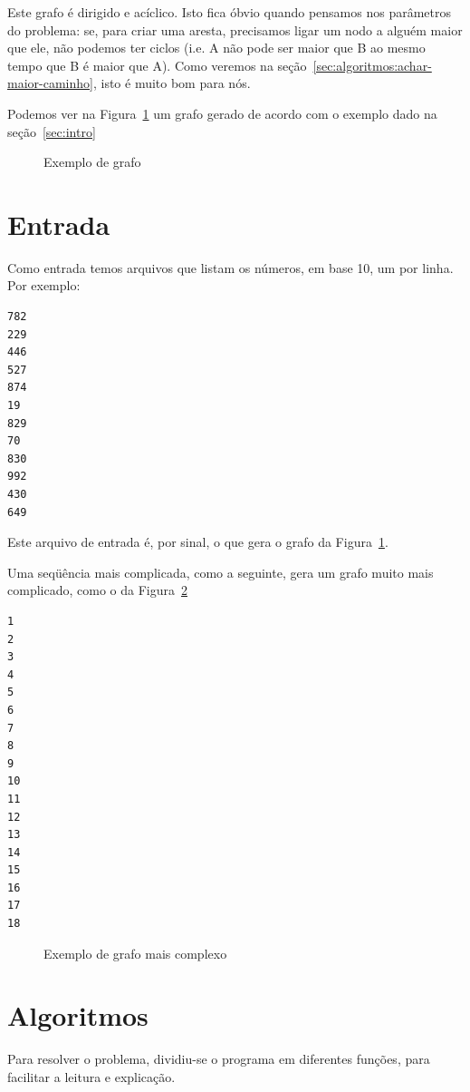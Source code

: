 \documentclass[12pt]{article}
\begin{document}
Este grafo é dirigido e acíclico. Isto fica óbvio quando pensamos nos parâmetros do problema: se, para criar uma aresta, precisamos ligar um nodo a alguém maior que ele, não podemos ter ciclos (i.e. A não pode ser maior que B ao mesmo tempo que B é maior que A). Como veremos na se\c{c}ão~\ref{sec:algoritmos:achar-maior-caminho}, isto é muito bom para nós.


Podemos ver na Figura~\ref{fig:testeprof} um grafo gerado de acordo com o exemplo dado na se\c{c}ão~\ref{sec:intro}

\begin{figure}[h!]
    \begin{dot2tex}[neato,options=-tmath]
        
    \end{dot2tex}
    \caption{Exemplo de grafo}
    \label{fig:testeprof}
\end{figure}

\section{Entrada}\label{sec:entrada}
Como entrada temos arquivos que listam os números, em base 10, um por linha. Por exemplo:
\begin{lstlisting}
782
229
446
527
874
19
829
70
830
992
430
649
\end{lstlisting}

Este arquivo de entrada é, por sinal, o que gera o grafo da Figura~\ref{fig:testeprof}.

Uma seqüência mais complicada, como a seguinte, gera um grafo muito mais complicado, como o da Figura~\ref{fig:testebobo}
\begin{lstlisting}
1
2
3
4
5
6
7
8
9
10
11
12
13
14
15
16
17
18
\end{lstlisting}

\begin{figure}[h!]
  \begin{dot2tex}[neato,options=-tmath]
    
  \end{dot2tex}
  \caption{Exemplo de grafo mais complexo}
  \label{fig:testebobo}
\end{figure}

\section{Algoritmos}\label{sec:algoritmos}
Para resolver o problema, dividiu-se o programa em diferentes fun\c{c}ões, para facilitar a leitura e explica\c{c}ão.
\end{document}
